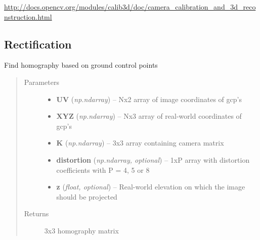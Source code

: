 \documentclass[letterpaper,10pt,english]{sphinxmanual}
\begin{document}


\href{http://docs.opencv.org/modules/calib3d/doc/camera\_calibration\_and\_3d\_reconstruction.html}{http://docs.opencv.org/modules/calib3d/doc/camera\_calibration\_and\_3d\_reconstruction.html}




\subsection{Rectification}
\label{flamingo/rectification/index:id1}\label{flamingo/rectification/index:module-flamingo.rectification.rectification}

\begin{fulllineitems}
\label{flamingo/rectification/index:flamingo.rectification.rectification.find_homography}
Find homography based on ground control points
\begin{quote}\begin{description}
\item[{Parameters}] \leavevmode\begin{itemize}
\item {} 
\textbf{UV} (\emph{np.ndarray}) -- Nx2 array of image coordinates of gcp's

\item {} 
\textbf{XYZ} (\emph{np.ndarray}) -- Nx3 array of real-world coordinates of gcp's

\item {} 
\textbf{K} (\emph{np.ndarray}) -- 3x3 array containing camera matrix

\item {} 
\textbf{distortion} (\emph{np.ndarray, optional}) -- 1xP array with distortion coefficients with P = 4, 5 or 8

\item {} 
\textbf{z} (\emph{float, optional}) -- Real-world elevation on which the image should be projected

\end{itemize}

\item[{Returns}] \leavevmode
3x3 homography matrix


\end{description}
\end{quote}
\end{fulllineitems}
\end{document}
